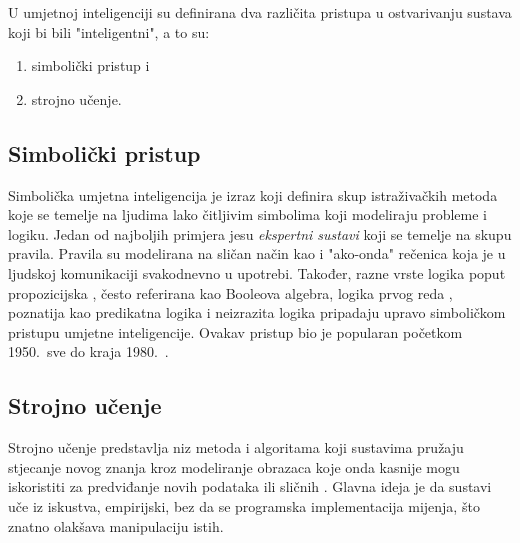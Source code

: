 \documentclass[times, utf8, zavrsni]{fer}
\begin{document}
U umjetnoj inteligenciji su definirana dva različita pristupa u ostvarivanju sustava koji bi bili "inteligentni", a to su:
\begin{center}
    \begin{enumerate}
        \item simbolički pristup i
        \item strojno učenje.
    \end{enumerate}
\end{center}

\subsection{Simbolički pristup}
Simbolička umjetna inteligencija  je izraz koji definira skup istraživačkih metoda koje se temelje na ljudima lako čitljivim simbolima  koji modeliraju probleme i logiku. Jedan od najboljih primjera jesu \textit{ekspertni sustavi}  koji se temelje na skupu pravila. Pravila su modelirana na sličan način kao i "ako-onda" rečenica  koja je u ljudskoj komunikaciji svakodnevno u upotrebi. Također, razne vrste logika poput propozicijska , često referirana kao Booleova algebra, logika prvog reda , poznatija kao predikatna logika  i neizrazita logika  pripadaju upravo simboličkom pristupu umjetne inteligencije. Ovakav pristup bio je popularan početkom 1950.\ sve do kraja 1980.\ \citep{wiki:SIMB}.

\subsection{Strojno učenje}
Strojno učenje  predstavlja niz metoda i algoritama koji sustavima pružaju stjecanje novog znanja kroz modeliranje obrazaca koje onda kasnije mogu iskoristiti za predviđanje novih podataka ili sličnih \citep{cupicML}. Glavna ideja je da sustavi uče iz iskustva, empirijski, bez da se programska implementacija mijenja, što znatno olakšava manipulaciju istih.
\end{document}

